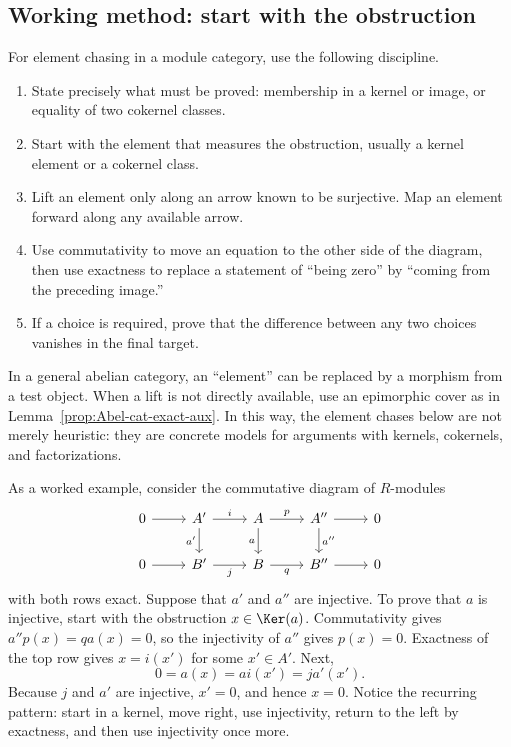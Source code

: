 \subsection*{Working method: start with the obstruction}

For element chasing in a module category, use the following discipline.
\begin{enumerate}
	\item State precisely what must be proved: membership in a kernel or
	image, or equality of two cokernel classes.
	\item Start with the element that measures the obstruction, usually a
	kernel element or a cokernel class.
	\item Lift an element only along an arrow known to be surjective. Map an
	element forward along any available arrow.
	\item Use commutativity to move an equation to the other side of the
	diagram, then use exactness to replace a statement of ``being zero'' by
	``coming from the preceding image.''
	\item If a choice is required, prove that the difference between any two
	choices vanishes in the final target.
\end{enumerate}
In a general abelian category, an ``element'' can be replaced by a morphism
from a test object. When a lift is not directly available, use an epimorphic
cover as in Lemma~\ref{prop:Abel-cat-exact-aux}. In this way, the element
chases below are not merely heuristic: they are concrete models for arguments
with kernels, cokernels, and factorizations.

As a worked example, consider the commutative diagram of $R$-modules
\[
\begin{tikzcd}
	0 \arrow[r] & A' \arrow[r, "i"] \arrow[d, "a'"'] & A \arrow[r, "p"] \arrow[d, "a"'] & A'' \arrow[r] \arrow[d, "a''"] & 0 \\
	0 \arrow[r] & B' \arrow[r, "j"'] & B \arrow[r, "q"'] & B'' \arrow[r] & 0
\end{tikzcd}
\]
with both rows exact. Suppose that $a'$ and $a''$ are injective. To prove
that $a$ is injective, start with the obstruction $x\in\Ker(a)$.
Commutativity gives $a''p(x)=qa(x)=0$, so the injectivity of $a''$ gives
$p(x)=0$. Exactness of the top row gives $x=i(x')$ for some $x'\in A'$.
Next,
\[
	0=a(x)=a i(x')=j a'(x').
\]
Because $j$ and $a'$ are injective, $x'=0$, and hence $x=0$. Notice the
recurring pattern: start in a kernel, move right, use injectivity, return to
the left by exactness, and then use injectivity once more.

